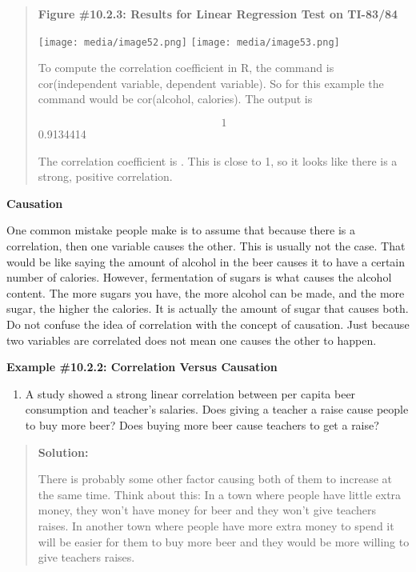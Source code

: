 \documentclass[]{book}
\providecommand{\tightlist}{%
  \setlength{\itemsep}{0pt}\setlength{\parskip}{0pt}}
\begin{document}
\begin{quote}
\textbf{Figure \#10.2.3: Results for Linear Regression Test on TI-83/84}

\texttt{[image: media/image52.png]}
\texttt{[image: media/image53.png]}

To compute the correlation coefficient in R, the command is cor(independent variable, dependent variable). So for this example the command would be cor(alcohol, calories). The output is

\[1\] 0.9134414

The correlation coefficient is . This is close to 1, so it looks like there is a strong, positive correlation.
\end{quote}

\textbf{Causation}

One common mistake people make is to assume that because there is a correlation, then one variable causes the other. This is usually not the case. That would be like saying the amount of alcohol in the beer causes it to have a certain number of calories. However, fermentation of sugars is what causes the alcohol content. The more sugars you have, the more alcohol can be made, and the more sugar, the higher the calories. It is actually the amount of sugar that causes both. Do not confuse the idea of correlation with the concept of causation. Just because two variables are correlated does not mean one causes the other to happen.

\textbf{Example \#10.2.2: Correlation Versus Causation}

\begin{enumerate}
\def\labelenumi{\alph{enumi}.}
\tightlist
\item
  A study showed a strong linear correlation between per capita beer consumption and teacher's salaries. Does giving a teacher a raise cause people to buy more beer? Does buying more beer cause teachers to get a raise?
\end{enumerate}

\begin{quote}
\textbf{Solution:}

There is probably some other factor causing both of them to increase at the same time. Think about this: In a town where people have little extra money, they won't have money for beer and they won't give teachers raises. In another town where people have more extra money to spend it will be easier for them to buy more beer and they would be more willing to give teachers raises.
\end{quote}
\end{document}
